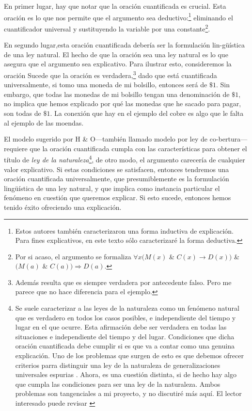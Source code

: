 En primer lugar, hay que notar que la oración cuantificada
es crucial. Esta oración es lo que nos permite que el 
argumento sea deductivo:\footnote{
  Estos autores también caracterizaron una forma inductiva
  de explicación. Para fines explicativos, en este texto
  sólo caracterizaré la forma deductiva. 
} 
eliminando el cuantificador universal y sustituyendo la 
variable por una constante\footnote{
	Por si acaso, el argumento se formaliza
  $\forall{x}(M(x)$ \& $C(x) \rightarrow
  D(x))$ \& $(M(a)$ \& $C(a))
  \Rightarrow	D(a)$. 
}. 

En segundo lugar,esta oración cuantificada debería ser la 
formulación lin-güística de una ley natural. El hecho de que
la oración sea una ley natural es lo que asegura que el
argumento sea explicativo. Para ilustrar esto, consideremos
la oración  Sucede que la oración es verdadera,\footnote{
	Además resulta que es siempre verdadera por antecedente
	falso. Pero me parece que no hace diferencia para el
	ejemplo. 
}
dado que está cuantificada  universalmente, si tomo una
moneda de mi bolsillo, entonces será de $ \$1 $. Sin
embargo, que todas las monedas de mi bolsillo tengan una
denominación de $\$1$, no implica que hemos explicado por
qué las monedas que he sacado para pagar, son todas de
$ \$1 $. La conexión que hay en el ejemplo del cobre es algo
que le falta al ejemplo de las moendas.

El modelo sugerido por H \& O---también llamado modelo por
ley de co-bertura---requiere que la oración cuantificada
cumpla con las características para obtener el título de
\emph{ley de la naturaleza}\footnote{ 
  Se suele caracterizar a las leyes de la naturaleza como un
  fenómeno natural que es verdadero en todos los casos
  posibles, e	independiente del tiempo y lugar en el que
  ocurre. Esta afirmación debe ser verdadera en todas las
  situaciones e independiente del tiempo y del lugar.
  Condiciones que dicha oración cuantificada debe	cumplir si
  es que va a contar como una genuina explicación. Uno de
  los problemas que surgen de esto es que debemos ofrecer
  criterios parra distinguir una ley de la naturaleza de
  generalizaciones	universales espurias
  \parencite{Nagel1962}. Ahora, es una cuestión distinta, si
  de hecho hay algo que cumpla las condiciones para ser una
  ley de la naturaleza. Ambos problemas son tangenciales a
  mi	proyecto, y no discutiré más aquí. El lector
  interesado puede revisar	\parencite{sep-laws-of-nature}
}, 
de otro modo, el argumento carecería de cualquier valor
explicativo. Si estas condiciones se satisfacen, entonces
tendremos una oración cuantificada universalmente, que
presumiblemente es la formulación lingüística de una ley
natural, y que implica como instancia particular el fenómeno
en cuestión que queremos explicar. Si esto sucede, entonces
hemos tenido éxito ofreciendo una explicación.

